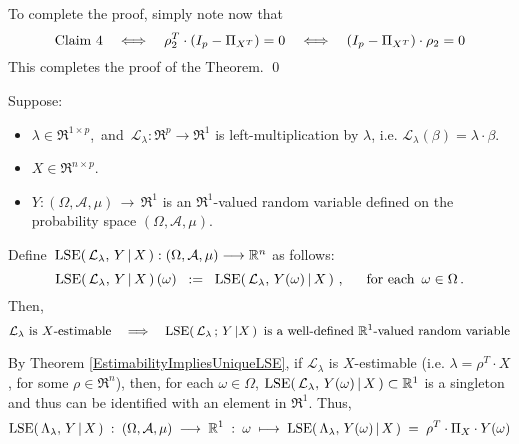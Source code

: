 \vskip 0.5cm
\noindent
To complete the proof, simply note now that
\begin{equation*}
\textnormal{Claim 4}
\quad\Longleftrightarrow\quad
	\rho_{2}^{T} \cdot (I_{p} - \Pi_{X^{T}}) = 0
\quad\Longleftrightarrow\quad
	(I_{p} - \Pi_{X^{T}}) \cdot \rho_{2} = 0
\end{equation*}
This completes the proof of the Theorem.
\qed

\begin{corollary}
\label{LSEofEstimableFunctionsAreRandomVariables}
\mbox{}\vskip 0.1cm\noindent
Suppose:
\begin{itemize}
\item
	$\lambda \in \Re^{1 \times p}$,\,
	and
	\,$\mathcal{L}_{\lambda} : \Re^{p} \longrightarrow \Re^{1}$ is left-multiplication by $\lambda$,
	i.e. $\mathcal{L}_{\lambda}(\beta) = \lambda \cdot \beta$.
\item
	$X \in \Re^{n \times p}$.
\item
	$Y : (\Omega,\mathcal{A},\mu) \,\longrightarrow\, \Re^{1}$ is an $\Re^{1}$-valued
	random variable defined on the probability space $(\Omega,\mathcal{A},\mu)$.
\end{itemize}
Define \,$\textnormal{LSE}\!\left(\,\mathcal{L}_{\lambda},\,Y\,\vert\,X\,\right) : (\Omega,\mathcal{A},\mu) \longrightarrow \mathbb{R}^{n}$
as follows:
\begin{equation*}
\textnormal{LSE}\!\left(\,\mathcal{L}_{\lambda},\,Y\,\vert\,X\,\right)(\omega)
\;\; := \;\; \textnormal{LSE}\!\left(\,\mathcal{L}_{\lambda},\,Y(\omega)\,\vert\,X\,\right)\,,
\quad\;\;
\textnormal{for each \,$\omega \in \Omega$}\,.
\end{equation*}
Then,
\begin{equation*}
\textnormal{$\mathcal{L}_{\lambda}$ is $X$-estimable}
\quad\Longrightarrow\quad
\textnormal{$\textnormal{LSE}\!\left(\,\mathcal{L}_{\lambda} \,;\, Y\,\vert X\,\right)$\, is a well-defined $\mathbb{R}^{1}$-valued random variable}
\end{equation*}
\end{corollary}
\proof
By Theorem \ref{EstimabilityImpliesUniqueLSE},
if $\mathcal{L}_{\lambda}$ is $X$-estimable (i.e. $\lambda = \rho^{T} \cdot X$, for some $\rho \in \Re^{n}$),
then, for each $\omega \in \Omega$,
$\textnormal{LSE}\!\left(\,\mathcal{L}_{\lambda},\,Y(\omega)\,\vert\,X\,\right) \subset \mathbb{R}^{1}$
is a singleton and thus can be identified with an element in $\Re^{1}$.
Thus,
\begin{equation*}
\textnormal{LSE}\!\left(\,\Lambda_{\lambda},\,Y\,\vert\,X\,\right)
\;:\; (\Omega,\mathcal{A},\mu) \; \longrightarrow \; \mathbb{R}^{1}
\;:\; \omega \; \longmapsto \; \textnormal{LSE}\!\left(\,\Lambda_{\lambda},\,Y(\omega)\,\vert\,X\,\right) \;=\; \rho^{T} \cdot \Pi_{X} \cdot Y(\omega)
\end{equation*}
